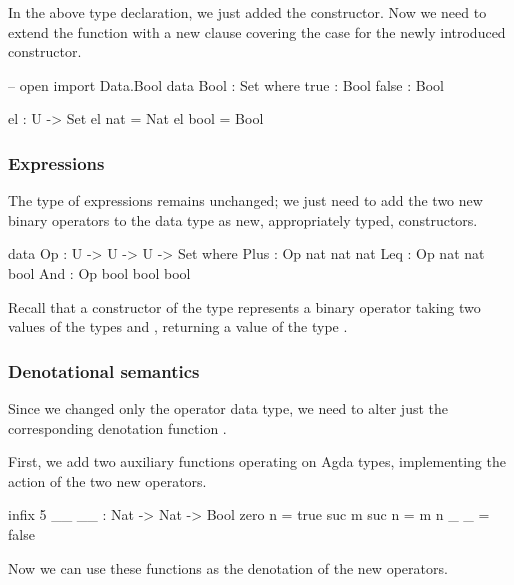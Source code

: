 \noindent In the above type declaration, we just added the 
constructor. Now we need to extend the function  with a new clause
covering the case for the newly introduced  constructor.

\begin{code}
  -- open import Data.Bool
  data Bool : Set where
    true : Bool
    false : Bool

  el : U -> Set
  el nat = Nat
  el bool = Bool
\end{code}\label{sec:lin-el}

\subsubsection{Expressions}

The type of expressions  remains unchanged; we just need to add the two new
binary operators to the data type  as new, appropriately typed,
constructors.

\begin{code}
  data Op : U -> U -> U -> Set where
    Plus : Op nat nat nat
    Leq : Op nat nat bool
    And : Op bool bool bool
\end{code}\label{sec:more-operators}

\noindent Recall that a constructor of the type  represents a
binary operator taking two values of the types  and ,
returning a value of the type .

\subsubsection{Denotational semantics}

Since we changed only the operator data type, we need to alter just the
corresponding denotation function .

First, we add two auxiliary functions operating on Agda types, implementing
the action of the two new operators.

\begin{code}
  infix 5 _\leq\_
  _\leq\_ : Nat -> Nat -> Bool
  zero \leq n = true
  suc m \leq suc n = m \leq n
  _ \leq _ = false
\end{code}

\noindent Now we can use these functions as the denotation of the new operators.


